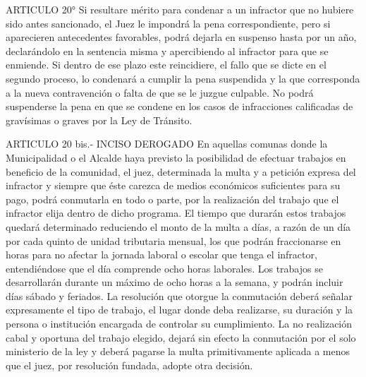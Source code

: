     ARTICULO 20° Si resultare mérito para condenar a un infractor que no hubiere sido antes sancionado, el Juez le impondrá la pena correspondiente, pero si aparecieren antecedentes favorables, podrá dejarla en suspenso hasta por un año, declarándolo en la sentencia misma y apercibiendo al infractor para que se enmiende.
    Si dentro de ese plazo este reincidiere, el fallo que se dicte en el segundo proceso, lo condenará a cumplir la pena suspendida y la que corresponda a la nueva contravención o falta de que se le juzgue culpable.
    No podrá suspenderse la pena en que se condene en los casos de infracciones calificadas de gravísimas o graves por la Ley de Tránsito.

    ARTICULO 20 bis.- INCISO DEROGADO
    En aquellas comunas donde la Municipalidad o el Alcalde haya previsto la posibilidad de efectuar trabajos en beneficio de la comunidad, el juez, determinada la multa y a petición expresa del infractor y siempre que éste carezca de medios económicos suficientes para su pago, podrá conmutarla en todo o parte, por la realización del trabajo que el infractor elija dentro de dicho programa.
    El tiempo que durarán estos trabajos quedará determinado reduciendo el monto de la multa a días, a razón de un día por cada quinto de unidad tributaria mensual, los que podrán fraccionarse en horas para no afectar la jornada laboral o escolar que tenga el infractor, entendiéndose que el día comprende ocho horas laborales. Los trabajos se desarrollarán durante un máximo de ocho horas a la semana, y podrán incluir días sábado y feriados.
    La resolución que otorgue la conmutación deberá señalar expresamente el tipo de trabajo, el lugar donde deba realizarse, su duración y la persona o institución encargada de controlar su cumplimiento. La no realización cabal y oportuna del trabajo elegido, dejará sin efecto la conmutación por el solo ministerio de la ley y deberá pagarse la multa primitivamente aplicada a menos que el juez, por resolución fundada, adopte otra decisión.

